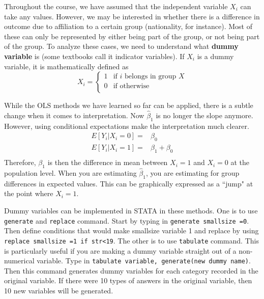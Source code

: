 \documentclass[12pt]{article}
\theoremstyle{definition}
\theoremstyle{property}
\theoremstyle{assumption}
\theoremstyle{example}
\theoremstyle{comment}
\begin{document}
Throughout the course, we have assumed that the independent variable $X_i$ can take any values. However, we may be interested in whether there is a difference in outcome due to affiliation to a certain group (nationality, for instance). Most of these can only be represented by either being part of the group, or not being part of the group. To analyze these cases, we need to understand what \textbf{dummy variable} is (some textbooks call it indicator variables). If $X_i$ is a dummy variable, it is mathematically defined as
\[
X_i = \begin{cases} 1 & \text{if $i$ belongs in group $X$} \\  0 & \text{if otherwise} \\ \end{cases}
\]
\par\medskip
While the OLS methods we have learned so far can be applied, there is a subtle change when it comes to interpretation. Now $\hat{\beta}_1$ is no longer the slope anymore. However, using conditional expectations make the interpretation much clearer.
\[
\begin{aligned}
E[Y_i |X_i=0]=& \beta_0\\
E[Y_i |X_i=1]=& \beta_1+\beta_0\\
\end{aligned}
\]
Therefore, $\beta_1$ is then the difference in mean between $X_i=1$ and $X_i=0$ at the population level. When you are estimating $\hat{\beta}_1$, you are estimating for group differences in expected values. This can be graphically expressed as a ``jump" at the point where $X_i=1$. \par\medskip
Dummy variables can be implemented in STATA in these methods. One is to use \texttt{generate} and \texttt{replace} command. Start by typing in \texttt{generate smallsize =0}. Then define conditions that would make smallsize variable 1 and replace by using \texttt{replace smallsize =1 if str<19}. The other is to use \texttt{tabulate} command. This is particularly useful if you are making a dummy variable straight out of a non-numerical variable. Type in \texttt{tabulate variable, generate(new dummy name)}. Then this command generates dummy variables for each category recorded in the original variable. If there were 10 types of answers in the original variable, then 10 new variables will be generated. \par\medskip 
\end{document}
